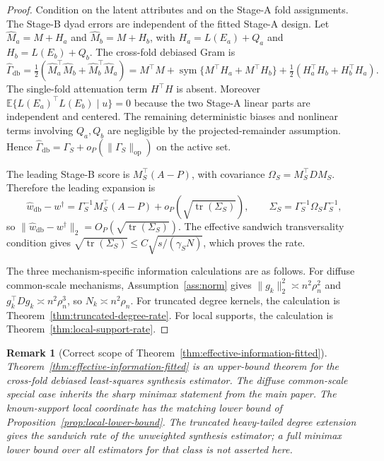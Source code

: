\documentclass[12pt]{article}
\newtheorem{remark}{Remark}
\newcommand{\1}{\mathbf{1}}
\begin{document}
\begin{proof}
Condition on the latent attributes and on the Stage-A fold assignments. The
Stage-B dyad errors are independent of the fitted Stage-A design. Let
\(\widehat M_a=M+H_a\) and \(\widehat M_b=M+H_b\), with \(H_a=L(E_a)+Q_a\) and
\(H_b=L(E_b)+Q_b\). The cross-fold debiased Gram is
\[
    \widehat\Gamma_{\mathrm{db}}
    =
    \tfrac12
    \left(
        \widehat M_a^\top\widehat M_b
        +
        \widehat M_b^\top\widehat M_a
    \right)
    =
    M^\top M
    +
    \operatorname{sym}\{M^\top H_a+M^\top H_b\}
    +
    \tfrac12(H_a^\top H_b+H_b^\top H_a).
\]
The single-fold attenuation term \(H^\top H\) is absent. Moreover
\(\mathbb E\{L(E_a)^\top L(E_b)\mid u\}=0\) because the two Stage-A linear
parts are independent and centered. The remaining deterministic biases and
nonlinear terms involving \(Q_a,Q_b\) are negligible by the projected-remainder
assumption. Hence \(\widehat\Gamma_{\mathrm{db}}=\Gamma_S+o_P(\|\Gamma_S\|_{\mathrm{op}})\)
on the active set.

The leading Stage-B score is \(M_S^\top(A-P)\), with covariance
\(\Omega_S=M_S^\top D M_S\). Therefore the leading expansion is
\[
    \widehat w_{\mathrm{db}}-w^\dagger
    =
    \Gamma_S^{-1}M_S^\top(A-P)+o_P\!\left(
        \sqrt{\operatorname{tr}(\Sigma_S)}
    \right),
    \qquad
    \Sigma_S=\Gamma_S^{-1}\Omega_S\Gamma_S^{-1},
\]
so \(\|\widehat w_{\mathrm{db}}-w^\dagger\|_2=O_P(\sqrt{\operatorname{tr}(\Sigma_S)})\).
The effective sandwich transversality condition gives
\(\sqrt{\operatorname{tr}(\Sigma_S)}\le C\sqrt{s/(\gamma_SN)}\), which
proves the rate.

The three mechanism-specific information calculations are as follows. For
diffuse common-scale mechanisms, Assumption~\ref{ass:norm} gives
\(\|g_k\|_2^2\asymp n^2\rho_n^2\) and \(g_k^\top Dg_k\asymp n^2\rho_n^3\), so
\(N_k\asymp n^2\rho_n\). For truncated degree kernels, the calculation is
Theorem~\ref{thm:truncated-degree-rate}. For local supports, the calculation
is Theorem~\ref{thm:local-support-rate}.
\end{proof}

\begin{remark}[Correct scope of Theorem~\ref{thm:effective-information-fitted}]
Theorem~\ref{thm:effective-information-fitted} is an upper-bound theorem for
the cross-fold debiased least-squares synthesis estimator. The diffuse
common-scale special case inherits the sharp minimax statement from the main
paper. The known-support local coordinate has the matching lower bound of
Proposition~\ref{prop:local-lower-bound}. The truncated heavy-tailed degree
extension gives the sandwich rate of the unweighted synthesis estimator; a
full minimax lower bound over all estimators for that class is not asserted
here.
\end{remark}
\end{document}
